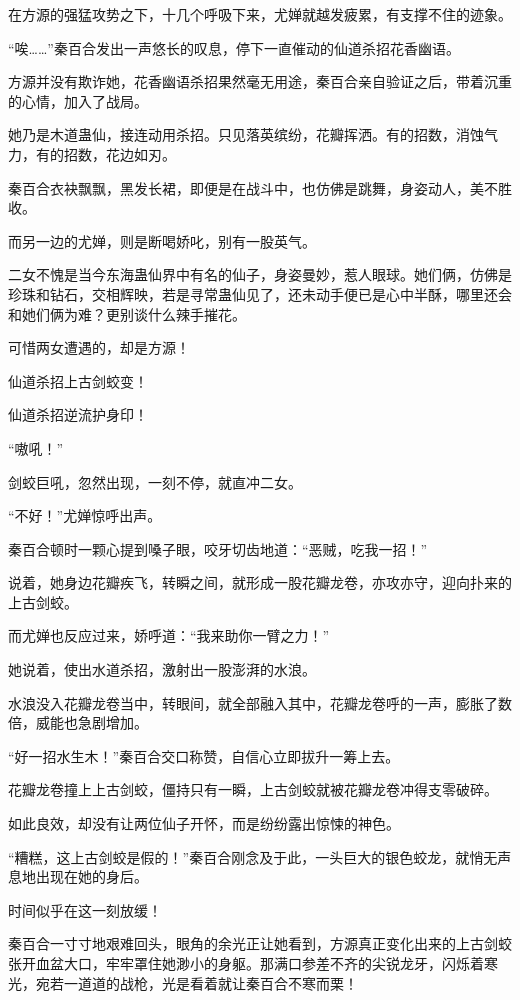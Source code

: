 
\begin{this_body}

在方源的强猛攻势之下，十几个呼吸下来，尤婵就越发疲累，有支撑不住的迹象。

“唉……”秦百合发出一声悠长的叹息，停下一直催动的仙道杀招花香幽语。

方源并没有欺诈她，花香幽语杀招果然毫无用途，秦百合亲自验证之后，带着沉重的心情，加入了战局。

她乃是木道蛊仙，接连动用杀招。只见落英缤纷，花瓣挥洒。有的招数，消蚀气力，有的招数，花边如刃。

秦百合衣袂飘飘，黑发长裙，即便是在战斗中，也仿佛是跳舞，身姿动人，美不胜收。

而另一边的尤婵，则是断喝娇叱，别有一股英气。

二女不愧是当今东海蛊仙界中有名的仙子，身姿曼妙，惹人眼球。她们俩，仿佛是珍珠和钻石，交相辉映，若是寻常蛊仙见了，还未动手便已是心中半酥，哪里还会和她们俩为难？更别谈什么辣手摧花。

可惜两女遭遇的，却是方源！

仙道杀招上古剑蛟变！

仙道杀招逆流护身印！

“嗷吼！”

剑蛟巨吼，忽然出现，一刻不停，就直冲二女。

“不好！”尤婵惊呼出声。

秦百合顿时一颗心提到嗓子眼，咬牙切齿地道：“恶贼，吃我一招！”

说着，她身边花瓣疾飞，转瞬之间，就形成一股花瓣龙卷，亦攻亦守，迎向扑来的上古剑蛟。

而尤婵也反应过来，娇呼道：“我来助你一臂之力！”

她说着，使出水道杀招，激射出一股澎湃的水浪。

水浪没入花瓣龙卷当中，转眼间，就全部融入其中，花瓣龙卷呼的一声，膨胀了数倍，威能也急剧增加。

“好一招水生木！”秦百合交口称赞，自信心立即拔升一筹上去。

花瓣龙卷撞上上古剑蛟，僵持只有一瞬，上古剑蛟就被花瓣龙卷冲得支零破碎。

如此良效，却没有让两位仙子开怀，而是纷纷露出惊悚的神色。

“糟糕，这上古剑蛟是假的！”秦百合刚念及于此，一头巨大的银色蛟龙，就悄无声息地出现在她的身后。

时间似乎在这一刻放缓！

秦百合一寸寸地艰难回头，眼角的余光正让她看到，方源真正变化出来的上古剑蛟张开血盆大口，牢牢罩住她渺小的身躯。那满口参差不齐的尖锐龙牙，闪烁着寒光，宛若一道道的战枪，光是看着就让秦百合不寒而栗！


\end{this_body}
